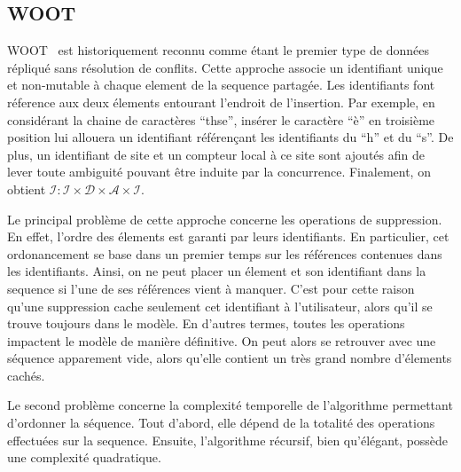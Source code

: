 
\subsection{WOOT}

WOOT~\cite{oster2006data} est historiquement reconnu comme étant le premier
type de données répliqué sans résolution de conflits. Cette approche associe un
identifiant unique et non-mutable à chaque element de la sequence partagée. Les
identifiants font réference aux deux élements entourant l'endroit de
l'insertion. Par exemple, en considérant la chaine de caractères ``thse'',
insérer le caractère ``è'' en troisième position lui allouera un identifiant
référençant les identifiants du ``h'' et du ``s''. De plus, un identifiant de
site et un compteur local à ce site sont ajoutés afin de lever toute ambiguité
pouvant être induite par la concurrence. Finalement, on obtient
$\mathcal{I}: \mathcal{I} \times \mathcal{D} \times \mathcal{A} \times
\mathcal{I}$.

Le principal problème de cette approche concerne les operations de suppression.
En effet, l'ordre des élements est garanti par leurs identifiants. En
particulier, cet ordonancement se base dans un premier temps sur les références
contenues dans les identifiants. Ainsi, on ne peut placer un élement et son
identifiant dans la sequence si l'une de ses références vient à manquer. C'est
pour cette raison qu'une suppression cache seulement cet identifiant à
l'utilisateur, alors qu'il se trouve toujours dans le modèle. En d'autres
termes, toutes les operations impactent le modèle de manière définitive. On
peut alors se retrouver avec une séquence apparement vide, alors qu'elle
contient un très grand nombre d'élements cachés.

Le second problème concerne la complexité temporelle de l'algorithme permettant
d'ordonner la séquence. Tout d'abord, elle dépend de la totalité des operations
effectuées sur la sequence. Ensuite, l'algorithme récursif, bien qu'élégant,
possède une complexité quadratique.



